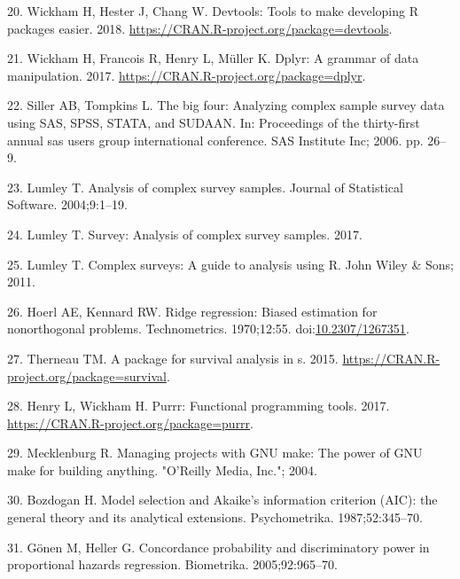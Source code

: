 \documentclass[12pt,oneside]{reedthesis}
\theoremstyle{definition}
\theoremstyle{definition}
\theoremstyle{definition}
\theoremstyle{remark}
\begin{document}
\leavevmode\hypertarget{ref-devtools_2018}{}%
20. Wickham H, Hester J, Chang W. Devtools: Tools to make developing R
packages easier. 2018.
\url{https://CRAN.R-project.org/package=devtools}.

\leavevmode\hypertarget{ref-dplyr_2017}{}%
21. Wickham H, Francois R, Henry L, Müller K. Dplyr: A grammar of data
manipulation. 2017. \url{https://CRAN.R-project.org/package=dplyr}.

\leavevmode\hypertarget{ref-Siller_2006}{}%
22. Siller AB, Tompkins L. The big four: Analyzing complex sample survey
data using SAS, SPSS, STATA, and SUDAAN. In: Proceedings of the
thirty-first annual sas users group international conference. SAS
Institute Inc; 2006. pp. 26--9.

\leavevmode\hypertarget{ref-Lumley_2004}{}%
23. Lumley T. Analysis of complex survey samples. Journal of Statistical
Software. 2004;9:1--19.

\leavevmode\hypertarget{ref-survey_2017}{}%
24. Lumley T. Survey: Analysis of complex survey samples. 2017.

\leavevmode\hypertarget{ref-Lumley_2011}{}%
25. Lumley T. Complex surveys: A guide to analysis using R. John Wiley
\& Sons; 2011.

\leavevmode\hypertarget{ref-Hoerl_1970}{}%
26. Hoerl AE, Kennard RW. Ridge regression: Biased estimation for
nonorthogonal problems. Technometrics. 1970;12:55.
doi:\href{https://doi.org/10.2307/1267351}{10.2307/1267351}.

\leavevmode\hypertarget{ref-survival_2015}{}%
27. Therneau TM. A package for survival analysis in s. 2015.
\url{https://CRAN.R-project.org/package=survival}.

\leavevmode\hypertarget{ref-purrr_2017}{}%
28. Henry L, Wickham H. Purrr: Functional programming tools. 2017.
\url{https://CRAN.R-project.org/package=purrr}.

\leavevmode\hypertarget{ref-Mecklenburg_2004}{}%
29. Mecklenburg R. Managing projects with GNU make: The power of GNU
make for building anything. "O'Reilly Media, Inc."; 2004.

\leavevmode\hypertarget{ref-Bozdogan_1987}{}%
30. Bozdogan H. Model selection and Akaike's information criterion
(AIC): the general theory and its analytical extensions. Psychometrika.
1987;52:345--70.

\leavevmode\hypertarget{ref-Gonen_2005}{}%
31. Gönen M, Heller G. Concordance probability and discriminatory power
in proportional hazards regression. Biometrika. 2005;92:965--70.
\end{document}

